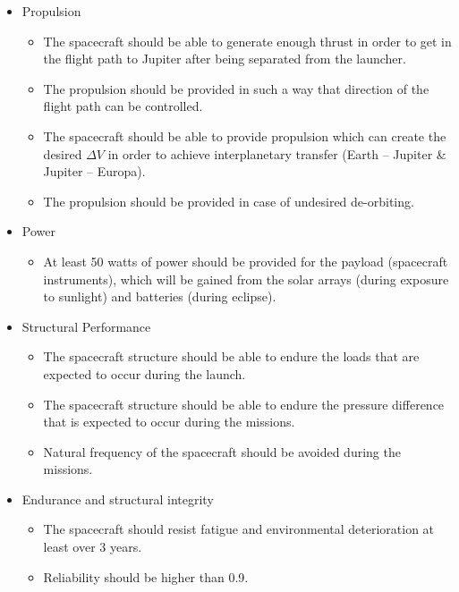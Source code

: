 \begin{itemize}

\item{Propulsion}
  \begin{itemize}
  \item The spacecraft should be able to generate enough thrust in
    order to get in the flight path to Jupiter after being separated
    from the launcher.
  \item The propulsion should be provided in such a way that direction
    of the flight path can be controlled.
  \item The spacecraft should be able to provide propulsion which can
    create the desired $\Delta V$ in order to achieve interplanetary
    transfer (Earth -- Jupiter \& Jupiter -- Europa).
  \item The propulsion should be provided in case of undesired
    de-orbiting.
  \end{itemize}

\item{Power}
  \begin{itemize}
  \item At least 50 watts of power should be provided for the payload
    (spacecraft instruments), which will be gained from the solar
    arrays (during exposure to sunlight) and batteries (during
    eclipse).
  \end{itemize}

\item{Structural Performance}
  \begin{itemize}
  \item The spacecraft structure should be able to endure the loads
    that are expected to occur during the launch.
  \item The spacecraft structure should be able to endure the pressure
    difference that is expected to occur during the missions.
  \item Natural frequency of the spacecraft should be avoided during
    the missions.
  \end{itemize}

\item{Endurance and structural integrity}
  \begin{itemize}
  \item The spacecraft should resist fatigue and environmental
    deterioration at least over 3 years.
  \item Reliability should be higher than 0.9.
  \end{itemize}


\end{itemize}
